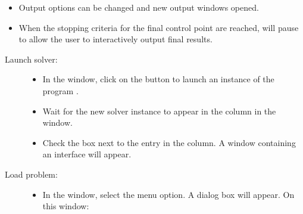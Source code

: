 \begin{list}{}{\setlength{\labelwidth}{0pt}
               \setlength{\leftmargin}{0pt}
               \setlength{\rightmargin}{\leftmargin}
               \setlength{\itemsep}{0pt}}
\begin{description}
\begin{itemize}
\begin{itemize}
        \item {\bf Run:}    Apply a sequence of fields until all complete.
        \item {\bf Relax:}  Run the ODE at the current applied field until
            the next control point is reached.
        \item {\bf Pause:}  Click anytime to stop the solver.  Continue
            simulation from paused point with  or .
        \item {\bf\boldmath Field$-$:} Apply the previous field again.
        \item {\bf\boldmath Field$+$:} Apply the next field in the list.
      \end{itemize}
      \item Output options can be changed and new output windows opened.
      \item When the stopping criteria for the final control point are
            reached,  will pause to allow the user to
            interactively output final results.
    \end{itemize}
  \end{description}
  \item {}
  \begin{description}
    \item[Launch solver:]\blankspace
    \begin{itemize}
      \item In the  window, click on the 
            button to launch an instance of the program
            .
      \item Wait for the new solver instance to appear in the 
           column in the  window.
      \item Check the box next to the  entry in the
           column.  A window containing an
           interface will appear.
    \end{itemize}
    \item[Load problem:]\blankspace
    \begin{itemize}
      \item In the  window, select the
         menu option.  A 
        dialog box will appear.  On this window:
        \begin{itemize}

\end{itemize}
\end{itemize}
\end{description}
\end{list}

